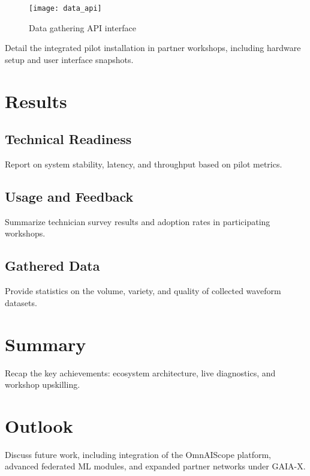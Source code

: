 \begin{figure}[ht]
  \centering
  \texttt{[image: data\_api]}
  \caption{Data gathering API interface}
  \label{fig:data-api}
\end{figure}
Detail the integrated pilot installation in partner workshops, including hardware setup and user interface snapshots.

\section{Results}
\subsection{Technical Readiness}
Report on system stability, latency, and throughput based on pilot metrics.

\subsection{Usage and Feedback}
Summarize technician survey results and adoption rates in participating workshops.

\subsection{Gathered Data}
Provide statistics on the volume, variety, and quality of collected waveform datasets.

\section{Summary}
Recap the key achievements: ecosystem architecture, live diagnostics, and workshop upskilling.

\section{Outlook}
Discuss future work, including integration of the OmnAIScope platform, advanced federated ML modules, and expanded partner networks under GAIA-X.


